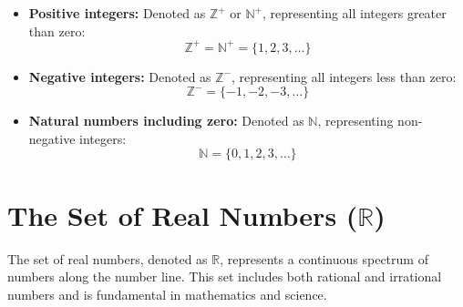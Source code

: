 \begin{itemize}
    \item \textbf{Positive integers:} Denoted as \( \mathbb{Z}^+ \) or \( \mathbb{N}^+ \), representing all integers greater than zero:
    \[
    \mathbb{Z}^+ = \mathbb{N}^+ = \{1, 2, 3, \dots\}
    \]
    \item \textbf{Negative integers:} Denoted as \( \mathbb{Z}^- \), representing all integers less than zero:
    \[
    \mathbb{Z}^- = \{-1, -2, -3, \dots\}
    \]
    \item \textbf{Natural numbers including zero:} Denoted as \( \mathbb{N} \), representing non-negative integers:
    \[
    \mathbb{N} = \{0, 1, 2, 3, \dots\}
    \]
\end{itemize}


\section{The Set of Real Numbers (\( \mathbb{R} \))}
The set of real numbers, denoted as \( \mathbb{R} \), represents a continuous spectrum of numbers along the number line. This set includes both rational and irrational numbers and is fundamental in mathematics and science.

